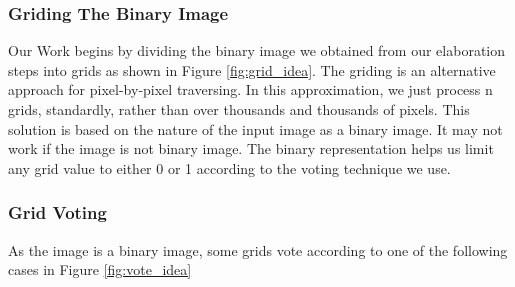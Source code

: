 \documentclass[12pt,fleqn]{book} %
\begin{document}
\subsubsection{Griding The Binary Image}
Our Work begins by dividing the binary image we obtained from our elaboration steps into grids as shown in Figure \ref{fig:grid_idea}. The griding is an alternative approach for pixel-by-pixel traversing. In this approximation, we just process n grids, standardly, rather than over thousands and thousands of pixels. This solution is based on the nature of the input image as a binary image. It may not work if the image is not binary image. The binary representation helps us limit any grid value to either 0 or 1 according to the voting technique we use.\bigskip
\begin{figure}[h]
\end{figure}

\subsubsection{Grid Voting}
As the image is a binary image, some grids vote according to one of the following cases in Figure \ref{fig:vote_idea}
\begin{figure}[h]
\end{figure}
\end{document}
